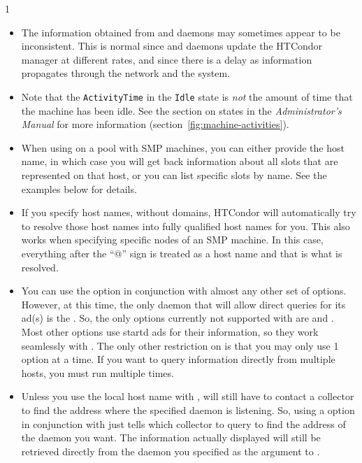 \begin{ManPage}{\label{man-condor-status}}{1}
\begin{itemize}
	\item The information obtained from  and 
	daemons
	may sometimes appear to be inconsistent.  This is normal since
	  and  daemons update the HTCondor
	manager at different rates, and since there is a
	delay as information propagates through the network and the system.

	\item Note that the \texttt{ActivityTime} in the \texttt{Idle} state is
	\emph{not} the amount of time that the machine has been idle.  See the
	section on  states in the \emph{Administrator's Manual}
	for more information (section~\ref{fig:machine-activities}).

	\item When using  on a pool with SMP machines,
	you can either provide the host name, in which case you will
	get back information about all slots that are represented on
	that host, or you can list specific slots by name.
	See the examples below for details.

	\item If you specify host names, without domains, HTCondor will
	automatically try to resolve those host names into fully
	qualified host names for you.
	This also works when specifying specific nodes of an SMP
	machine.
	In this case, everything after the ``@'' sign is treated as a
	host name and that is what is resolved.

	\item You can use the  option in conjunction with
	almost any other set of options.
	However, at this time, the only daemon that will allow direct
	queries for its ad(s) is the .
	So, the only options currently not supported with
	 are  and .
	Most other options use startd ads for their information, so
	they work seamlessly with .
	The only other restriction on  is that you may
	only use 1  option at a time.
	If you want to query information directly from multiple hosts,
	you must run  multiple times.

	\item Unless you use the local host name with ,
	 will still have to contact a collector to find
	the address where the specified daemon is listening.
	So, using a  option in conjunction with
	 just tells  which collector to
	query to find the address of the daemon you want.
	The information actually displayed will still be retrieved
	directly from the daemon you specified as the argument to
	.


\end{itemize}
\end{ManPage}
